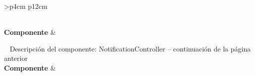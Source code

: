 \begin{longtable}{
    >{}p{4cm}
    p{12cm}
    }
    \caption{Descripción del componente: NotificationController} \label{table:descripcion_notificationcontroller} \\
    \toprule
    \textbf{Componente} &  \\
    \endfirsthead
    
    {{ \tablename\ \thetable{} Descripción del componente: NotificationController -- continuación de la página anterior}} \\
    \toprule
    \textbf{Componente} &  \\
    \midrule
    \endhead
    
    \midrule
     \\ 
    \endfoot
    
    \bottomrule
    \endlastfoot
    

\end{longtable}
